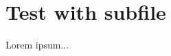 \documentclass[main.tex]{subfiles}
\begin{document}
\section{Test with subfile} 
Lorem ipsum...
\end{document}
